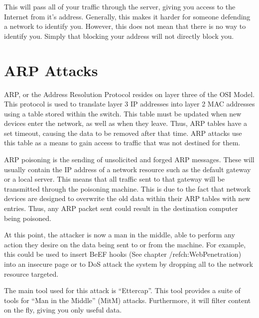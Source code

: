 		This will pass all of your traffic through the server, giving you access to the Internet from it's address.
		Generally, this makes it harder for someone defending a network to identify you.
		However, this does not mean that there is no way to identify you.
		Simply that blocking your address will not directly block you.

	\section{ARP Attacks}
		ARP, or the Address Resolution Protocol resides on layer three of the OSI Model.
		This protocol is used to translate layer 3 IP addresses into layer 2 MAC addresses using a table stored within the switch.
		This table must be updated when new devices enter the network, as well as when they leave.
		Thus, ARP tables have a set timeout, causing the data to be removed after that time.
		ARP attacks use this table as a means to gain access to traffic that was not destined for them.

		ARP poisoning is the sending of unsolicited and forged ARP messages.
		These will usually contain the IP address of a network resource such as the default gateway or a local server.
		This means that all traffic sent to that gateway will be transmitted through the poisoning machine.
		This is due to the fact that network devices are designed to overwrite the old data within their ARP tables with new entries.
		Thus, any ARP packet sent could result in the destination computer being poisoned.

		At this point, the attacker is now a man in the middle, able to perform any action they desire on the data being sent to or from the machine.
		For example, this could be used to insert BeEF hooks (See chapter /ref{ch:WebPenetration}) into an insecure page or to DoS attack the system by dropping all to the network resource targeted.

		The main tool used for this attack is ``Ettercap''.
		This tool provides a suite of tools for ``Man in the Middle'' (MitM) attacks.
		Furthermore, it will filter content on the fly, giving you only useful data.

